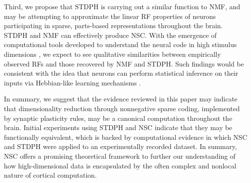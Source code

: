 Third, we propose that \ac{STDPH} is carrying out a similar function to \ac{NMF},
and may be attempting to approximate the linear \ac{RF} properties of
neurons participating in sparse, parts-based representations
throughout the brain. STDPH and NMF can effectively produce NSC.
With the emergence of computational tools developed
to understand the neural code 
in high stimulus dimensions \citep{PillowSimoncelli2006},
we expect to see qualitative similarities between empirically observed
\acp{RF} and those recovered by \ac{NMF} and \ac{STDPH}.
Such findings would be consistent with the idea that neurons
can perform statistical inference on their inputs via
Hebbian-like learning mechanisms
\citep{Nessler2009,Carlson2013,MorenoBoteDrugowitsch2015,Oja1982}.



In summary, we suggest that the evidence reviewed in this paper may indicate that dimensionality reduction through nonnegative sparse coding, implemented by synaptic plasticity rules, may be a canonical computation throughout the brain. Initial experiments using STDPH and \ac{NSC} indicate that they may be functionally equivalent, which is backed by computational evidence in which \ac{NSC} and \ac{STDPH} were applied to an experimentally recorded dataset. In summary, \ac{NSC} offers a promising theoretical framework to further our understanding of how high-dimensional data is encapsulated by the often complex and nonlocal nature of cortical computation.



